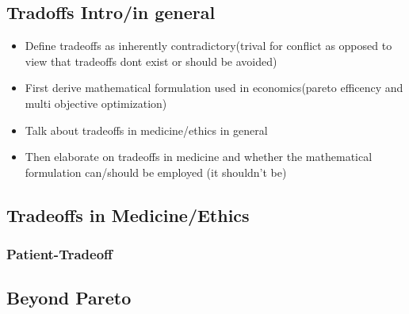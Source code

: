 \subsection{Tradoffs Intro/in general}
\begin{itemize}
	\item Define tradeoffs as  inherently contradictory(trival for conflict as opposed to view that tradeoffs dont exist or should be avoided)
	\item First derive mathematical formulation used in economics(pareto efficency and multi objective optimization)
	\item Talk about tradeoffs in medicine/ethics in general
	\item Then elaborate on tradeoffs in medicine and whether the mathematical formulation can/should be employed (it shouldn't be)
\end{itemize}
\subsection{Tradeoffs in Medicine/Ethics}
\subsubsection{Patient-Tradeoff}

\subsubsection{}
\subsection{Beyond Pareto}
